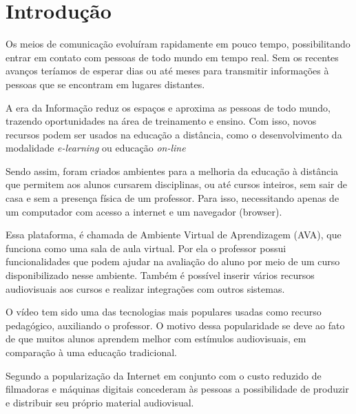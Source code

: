 \chapter{Introdução}
%
%
Os meios de comunicação evoluíram rapidamente em pouco tempo, possibilitando entrar em contato com pessoas de todo mundo em tempo real. Sem os recentes avanços teríamos de esperar dias ou até meses para transmitir informações à pessoas que se encontram em lugares distantes.
%
%
%
%

%
%
%
%
%
A era da Informação reduz os espaços e aproxima as pessoas de todo mundo, trazendo oportunidades na área de treinamento e ensino. Com isso, novos recursos podem ser usados na educação a distância, como o desenvolvimento da modalidade \textit{e-learning} ou educação \textit{on-line}

Sendo assim, foram criados ambientes para a melhoria da educação à distância que permitem aos alunos cursarem disciplinas, ou até cursos inteiros, sem sair de casa e sem a presença física de um professor. Para isso, necessitando apenas de um computador com acesso a internet e um navegador (browser).

Essa plataforma, é chamada de Ambiente Virtual de Aprendizagem (AVA), que funciona como uma sala de aula virtual. Por ela o professor possui funcionalidades que podem ajudar na avaliação do aluno por meio de um curso disponibilizado nesse ambiente. Também é possível inserir vários recursos audiovisuais aos cursos e realizar integrações com outros sistemas.

O vídeo tem sido uma das tecnologias mais populares usadas como recurso pedagógico, auxiliando o professor. O motivo dessa popularidade se deve ao fato de que muitos alunos aprendem melhor com estímulos audiovisuais, em comparação à uma educação tradicional.

Segundo  a popularização da Internet em conjunto com o custo reduzido de filmadoras e máquinas digitais concederam às pessoas a possibilidade de produzir e distribuir seu próprio material audiovisual.

